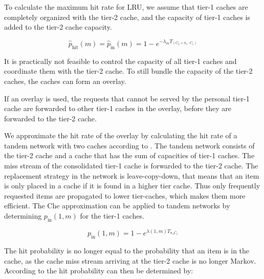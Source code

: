 To calculate the maximum hit rate for LRU, we assume that tier-1 caches are completely organized with the tier-2 cache, and the capacity of tier-1 caches is added to the tier-2 cache capacity.

\begin{equation}
\hat p_\text{hit}(m)=\hat p_\text{in}(m)=1-e^{-\lambda_{m}T_{(C_2+n_1\cdot C_{1})}}
\end{equation}

It is practically not feasible to control the capacity of all tier-1 caches and coordinate them with the tier-2 cache.
To still bundle the capacity of the tier-2 caches, the caches can form an overlay.




If an overlay is used, the requests that cannot be served by the personal tier-1 cache are forwarded to other tier-1 caches in the overlay, before they are forwarded to the tier-2 cache.

We approximate the hit rate of the overlay by calculating the hit rate of a tandem network with two caches according to \cite{martina2014unified}. The tandem network consists of the tier-2 cache and a cache that has the sum of capacities of tier-1 caches. The miss stream of the consolidated tier-1 cache is forwarded to the tier-2 cache.
The replacement strategy in the network is leave-copy-down, that means that an item is only placed in a cache if it is found in a higher tier cache. Thus only frequently requested items are propagated to lower tier-caches, which makes them more efficient. The Che approximation can be applied to tandem networks by determining $p_\text{in}(1,m)$ for the tier-1 caches.

\begin{equation}
p_\text{in}(1,m) = 1-e^{\lambda(1,m)T_{n_1 C_1}}
\end{equation}

The hit probability is no longer equal to the probability that an item is in the cache, as the cache miss stream arriving at the tier-2 cache is no longer Markov. According to \cite{martina2014unified} the hit probability can then be determined by:


